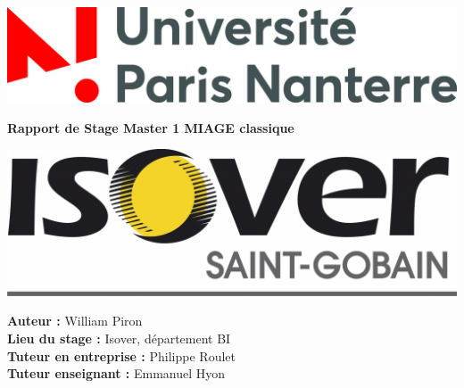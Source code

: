 \documentclass[a4paper,12pt]{article}
\begin{document}
\begin{titlepage}
		\newpage
		\thispagestyle{empty}
		\begin{center}
			\includegraphics[scale=0.1]{illustrations/logo-paris-nanterre}	
		\end{center}
		\begin{center}
			\vspace{0.3cm}
			\large  
			\textbf{Rapport de Stage Master 1 MIAGE classique}\\
			\vspace{0.7cm} \large 
			\vskip 0.2in
		\end{center}
		\begin{center}
		    \includegraphics[scale=0.25]{illustrations/isover-logo}		
		\end{center}
		
		\begin{flushleft}
			\begin{center}
			    
			    \textbf{Auteur :}
				\hspace{0.1cm} William Piron \\
				\textbf{Lieu du stage :}
				\hspace{0.1cm}Isover, département BI\\
				\textbf{Tuteur en entreprise :}
				\hspace{0.1cm} Philippe Roulet \\
				\textbf{Tuteur enseignant :}
				\hspace{0.1cm} Emmanuel Hyon \\
							

\end{center}
\end{flushleft}
\end{titlepage}
\end{document}
